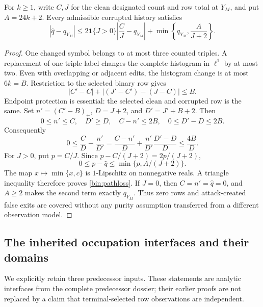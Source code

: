 \begin{lemma}
\label{bin:envelope}
For $k\ge1$, write $C,J$ for the clean designated count and row total at $Y_M$, and put $A=24k+2$. Every admissible corrupted history satisfies
\begin{equation}
 \left|\widehat q-q_{Y_M}\right|
 \le 2\mathbf 1\{J>0\}\left|\frac CJ-q_{Y_M}\right|
       +\min\left\{q_{Y_M},\frac{A}{J+2}\right\}.
 \label{bin:pathloss}
\end{equation}
\end{lemma}
\begin{proof}
One changed symbol belongs to at most three counted triples. A replacement of one triple label changes the complete histogram in $\ell^1$ by at most two. Even with overlapping or adjacent edits, the histogram change is at most $6k=B$. Restriction to the selected binary row gives
\[
 |C'-C|+|(J'-C')-(J-C)|\le B.
\]
Endpoint protection is essential: the selected clean and corrupted row is the same. Set $n'=(C'-B)_+$, $D=J+2$, and $D'=J'+B+2$. Then
\[
 0\le n'\le C,\quad D'\ge D,\quad C-n'\le2B,
 \quad 0\le D'-D\le2B.
\]
Consequently
\[
 0\le \frac CD-\frac{n'}{D'}
 =\frac{C-n'}D+\frac{n'}{D'}\frac{D'-D}D
 \le\frac{4B}{D}.
\]
For $J>0$, put $p=C/J$. Since $p-C/(J+2)=2p/(J+2)$,
\[
 0\le p-\widehat q\le\min\{p,A/(J+2)\}.
\]
The map $x\mapsto\min\{x,c\}$ is $1$-Lipschitz on nonnegative reals. A triangle inequality therefore proves \eqref{bin:pathloss}. If $J=0$, then $C=n'=\widehat q=0$, and $A\ge2$ makes the second term exactly $q_{Y_M}$. Thus zero rows and attack-created false exits are covered without any purity assumption transferred from a different observation model.
\end{proof}

\subsection{The inherited occupation interfaces and their domains}
We explicitly retain three predecessor inputs. These statements are analytic interfaces from the complete predecessor dossier; their earlier proofs are not replaced by a claim that terminal-selected row observations are independent.

